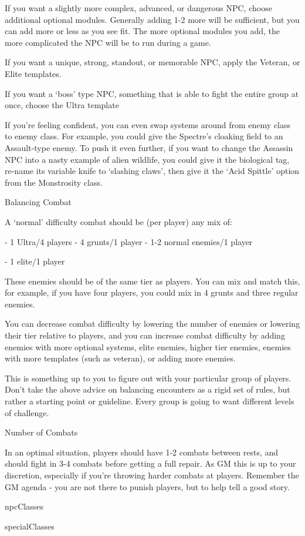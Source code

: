 If you want a slightly more complex, advanced, or dangerous NPC, choose additional optional
modules. Generally adding 1-2 more will be sufficient, but you can add more or less as you see
fit. The more optional modules you add, the more complicated the NPC will be to run during a
game.


If you want a unique, strong, standout, or memorable NPC, apply the Veteran, or Elite templates.


If you want a ‘boss’ type NPC, something that is able to fight the entire group at once, choose
the Ultra template


If you’re feeling confident, you can even swap systems around from enemy class to enemy class.
For example, you could give the Spectre’s cloaking field to an Assault-type enemy. To push it
even further, if you want to change the Assassin NPC into a nasty example of alien wildlife, you
could give it the biological tag, re-name its variable knife to ‘slashing claws’, then give it the ‘Acid
Spittle’ option from the Monstrosity class.


                                            Balancing Combat


A ‘normal’ difficulty combat should be (per player) any mix of:

    -   1 Ultra/4 players
    -   4 grunts/1 player
    -   1-2 normal enemies/1 player

    -   1 elite/1 player

These enemies should be of the same tier as players. You can mix and match this, for example, if
you have four players, you could mix in 4 grunts and three regular enemies.


You can decrease combat difficulty by lowering the number of enemies or lowering their tier
relative to players, and you can increase combat difficulty by adding enemies with more optional
systems, elite enemies, higher tier enemies, enemies with more templates (such as veteran), or
adding more enemies.





This is something up to you to figure out with your particular group of players. Don’t take the
above advice on balancing encounters as a rigid set of rules, but rather a starting point or
guideline. Every group is going to want different levels of challenge.


                                          Number of Combats

In an optimal situation, players should have 1-2 combats between rests, and should fight in 3-4
combats before getting a full repair. As GM this is up to your discretion, especially if you’re
throwing harder combats at players. Remember the GM agenda - you are not there to punish
players, but to help tell a good story.

{npcClasses}

{specialClasses}
